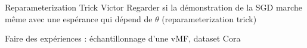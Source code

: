 \begin{frame}{Reparameterization Trick Victor}
    Regarder si la démonstration de la SGD marche même avec une espérance qui dépend de $\theta$ (reparameterization trick)
  
  Faire des expériences : échantillonnage d'une vMF, dataset Cora
  
  \end{frame}